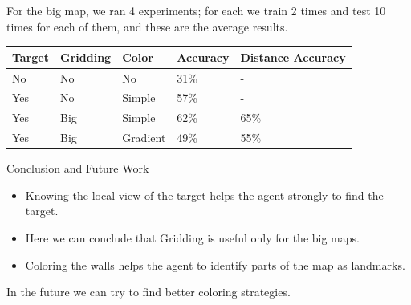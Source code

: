 \documentclass{beamer}
\begin{document}
\begin{frame}
For the big map, we ran 4 experiments; for each we train 2 times and test 10 times for each of them, and these are the average results.
\begin{center}
    \begin{tabular}{| l | l | l | l | l |}
    \hline
    Target & Gridding & Color & Accuracy & Distance Accuracy \\ \hline
    No & No & No & 31\% & - \\ \hline
    Yes & No & Simple & 57\% & - \\ \hline
    Yes & Big& Simple & 62\% & 65\% \\ \hline
    Yes & Big & Gradient & 49\% & 55\% \\ \hline
    \end{tabular}
\end{center}
\end{frame}

\begin{frame}{Conclusion and Future Work}
\begin{itemize}
    \item Knowing the local view of the target helps the agent strongly to find the target.
    \item Here we can conclude that Gridding is useful only for the big maps.
    \item Coloring the walls helps the agent to identify parts of the map as landmarks.
\end{itemize}
In the future we can try to find better coloring strategies.

\end{frame}
\end{document}
